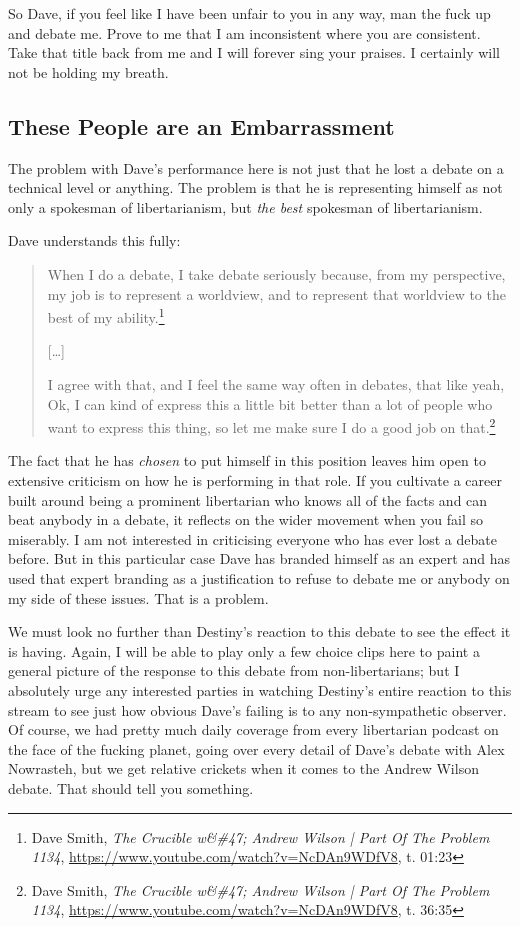 \documentclass[11pt]{article}
\begin{document}
So Dave, if you feel like I have been unfair to you in any way, man the fuck up and debate me. Prove to me that I am inconsistent where you are consistent. Take that title back from me and I will forever sing your praises. I certainly will not be holding my breath.
\subsection{These People are an Embarrassment}
\label{sec:orgdf917a9}
The problem with Dave's performance here is not just that he lost a debate on a technical level or anything. The problem is that he is representing himself as not only a spokesman of libertarianism, but \emph{the best} spokesman of libertarianism.

Dave understands this fully:
\begin{quote}
When I do a debate, I take debate seriously because, from my perspective,  my job is to represent a worldview, and to represent that worldview to the best of my ability.\footnote{Dave Smith, \emph{The Crucible w\&\#47; Andrew Wilson | Part Of The Problem 1134}, \url{https://www.youtube.com/watch?v=NcDAn9WDfV8}, t. 01:23}

{[}\ldots{}]

I agree with that, and I feel the same way often in debates, that like yeah, Ok, I can kind of express this a little bit better than a lot of people who want to express this thing, so let me make sure I do a good job on that.\footnote{Dave Smith, \emph{The Crucible w\&\#47; Andrew Wilson | Part Of The Problem 1134}, \url{https://www.youtube.com/watch?v=NcDAn9WDfV8}, t. 36:35}
\end{quote}

The fact that he has \emph{chosen} to put himself in this position leaves him open to extensive criticism on how he is performing in that role. If you cultivate a career built around being a prominent libertarian who knows all of the facts and can beat anybody in a debate, it reflects on the wider movement when you fail so miserably. I am not interested in criticising everyone who has ever lost a debate before. But in this particular case Dave has branded himself as an expert and has used that expert branding as a justification to refuse to debate me or anybody on my side of these issues. That is a problem.

We must look no further than Destiny's reaction to this debate to see the effect it is having. Again, I will be able to play only a few choice clips here to paint a general picture of the response to this debate from non-libertarians; but I absolutely urge any interested parties in watching Destiny's entire reaction to this stream to see just how obvious Dave's failing is to any non-sympathetic observer. Of course, we had pretty much daily coverage from every libertarian podcast on the face of the fucking planet, going over every detail of Dave's debate with Alex Nowrasteh, but we get relative crickets when it comes to the Andrew Wilson debate. That should tell you something.
\end{document}

